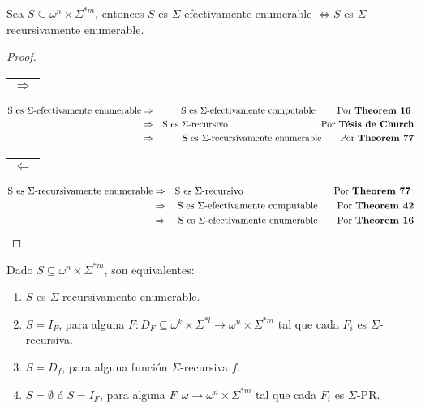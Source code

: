   \begin{theorem}
    \PN Sea $S \subseteq \omega^{n} \times \Sigma^{\ast m}$, entonces $S$ es $\Sigma$-efectivamente enumerable
    $\Leftrightarrow S$ es $\Sigma$-recursivamente enumerable.
  \end{theorem}
  \begin{proof}
    \begin{tabular}{|c|} \hline $\Rightarrow$ \\\hline \end{tabular}
    \begin{eqnarray*}
      \text{S es $\Sigma$-efectivamente enumerable} &\Rightarrow& \text{S es $\Sigma$-efectivamente computable} \qquad
        \text{ Por \textbf{Theorem 16}} \\
      &\Rightarrow& \text{S es $\Sigma$-recursivo} \qquad\qquad\qquad\qquad\qquad \text{Por \textbf{Tésis de Church}} \\
      &\Rightarrow& \text{S es $\Sigma$-recursivamente enumerable} \qquad \text{Por \textbf{Theorem 77}}
    \end{eqnarray*}

    \PN \begin{tabular}{|c|} \hline $\Leftarrow$ \\\hline \end{tabular}
    \begin{eqnarray*}
      \text{S es $\Sigma$-recursivamente enumerable} &\Rightarrow& \text{S es $\Sigma$-recursivo} \qquad\qquad\qquad
        \qquad\ \ \ \text{ Por \textbf{Theorem 77}} \\
      &\Rightarrow& \text{S es $\Sigma$-efectivamente computable} \qquad \text{Por \textbf{Theorem 42}} \\
      &\Rightarrow& \text{S es $\Sigma$-efectivamente enumerable} \qquad \text{Por \textbf{Theorem 16}}
    \end{eqnarray*}
  \end{proof}

  \begin{theorem}
    \PN Dado $S \subseteq \omega^{n} \times \Sigma^{\ast m}$, son equivalentes:
    \begin{enumerate}
      \item $S$ es $\Sigma$-recursivamente enumerable.
      \item $S = I_{F}$, para alguna $F: D_{F} \subseteq \omega^{k} \times \Sigma^{\ast l} \rightarrow \omega^{n} \times
        \Sigma^{\ast m}$ tal que cada $F_{i}$ es $\Sigma$-recursiva.
      \item $S = D_{f}$, para alguna función $\Sigma$-recursiva $f$.
      \item $S = \emptyset $ ó $S = I_{F}$, para alguna $F: \omega \rightarrow \omega^{n} \times \Sigma^{\ast m}$ tal
        que cada $F_{i}$ es $\Sigma$-PR.
    \end{enumerate}
  \end{theorem}

